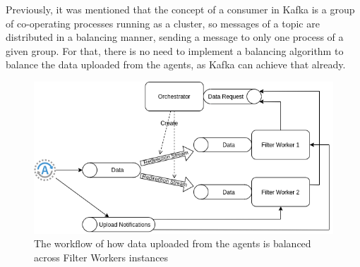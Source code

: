 Previously, it was mentioned that the concept of a consumer in Kafka is a group of co-operating processes running as a cluster, so messages of a topic are distributed in a balancing manner, sending a message to only one process of a given group.
For that, there is no need to implement a balancing algorithm to balance the data uploaded from the agents, as Kafka can achieve that already.

\begin{figure}[H]
    \center
    \includegraphics[width=\textwidth]{orchestrator-role}
    \caption{The workflow of how data uploaded from the agents is balanced across Filter Workers instances}
    \label{fig:orchestrator-role}
\end{figure}

